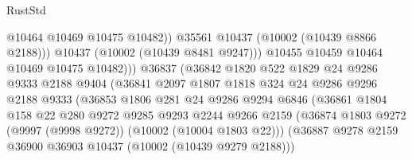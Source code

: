 \begin{lexlean}{RustStd}
\begin{coremodule}
                                        @10464
                                        @10469
                                        @10475
                                        @10482))
                                    @35561
                                    @10437
                                    (@10002 (@10439 @8866 @2188)))
                                  @10437
                                  (@10002 (@10439 @8481 @9247)))
                                @10455
                                @10459
                                @10464
                                @10469
                                @10475
                                @10482)))
                          @36837
                          (@36842
                            @1820
                            @522
                            @1829
                            @24
                            @9286
                            @9333
                            @2188
                            @9404
                            (@36841
                              @2097
                              @1807
                              @1818
                              @324
                              @24
                              @9286
                              @9296
                              @2188
                              @9333
                              (@36853
                                @1806
                                @281
                                @24
                                @9286
                                @9294
                                @6846
                                (@36861
                                  @1804
                                  @158
                                  @22
                                  @280
                                  @9272
                                  @9285
                                  @9293
                                  @2244
                                  @9266
                                  @2159
                                  (@36874
                                    @1803
                                    @9272
                                    (@9997 (@9998 @9272))
                                    (@10002 (@10004 @1803 @22)))
                                  (@36887
                                    @9278
                                    @2159
                                    @36900
                                    @36903
                                    @10437
                                    (@10002 (@10439 @9279 @2188)))

\end{coremodule}
\end{lexlean}
